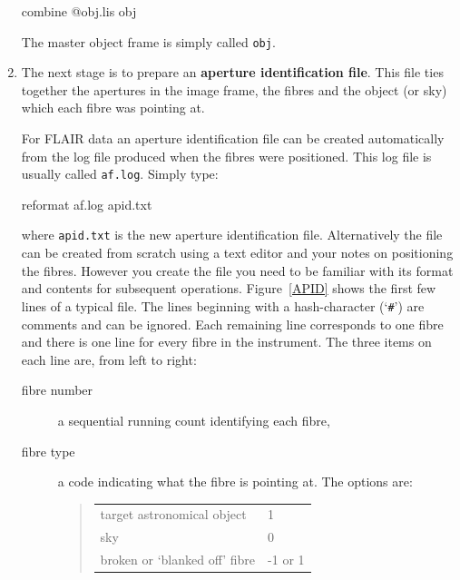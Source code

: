 \documentclass[twoside,11pt]{starlink}
\begin{document}
\begin{enumerate}
\begin{terminalv}
combine  @obj.lis  obj
\end{terminalv}

   The master object frame is simply called \texttt{obj}.

  \item The next stage is to prepare an \textbf{aperture
   identification file}.  This file ties together the apertures
   in the image frame, the fibres and the object (or sky)
   which each fibre was pointing at.

   For FLAIR data an aperture identification file can be
   created automatically from the log file produced when the
   fibres were positioned.  This log file is usually called \texttt{af.log}.  Simply type:

\begin{terminalv}
reformat  af.log  apid.txt
\end{terminalv}

   where \texttt{apid.txt} is the new aperture identification file.
   Alternatively the file can be created from scratch using a text editor
   and your notes on positioning the fibres.  However you create the file
   you need to be familiar with its format and contents for subsequent
   operations.  Figure~\ref{APID} shows the first few lines of a typical
   file.  The lines beginning with a hash-character (`\texttt{\#}') are comments
   and can be ignored.  Each remaining line corresponds to one fibre and
   there is one line for every fibre in the instrument.  The three items on
   each line are, from left to right:

  \begin{description}

    \item[fibre number] a sequential running count identifying
     each fibre,

    \item[fibre type] a code indicating what the fibre is
     pointing at.  The options are:

    \begin{verse}
    \begin{tabular}{ll}
     target astronomical object    & 1 \\
     sky                           & 0 \\
     broken or `blanked off' fibre & -1 or 1 \\
    \end{tabular}
    \end{verse}


\end{description}
\end{enumerate}
\end{document}
